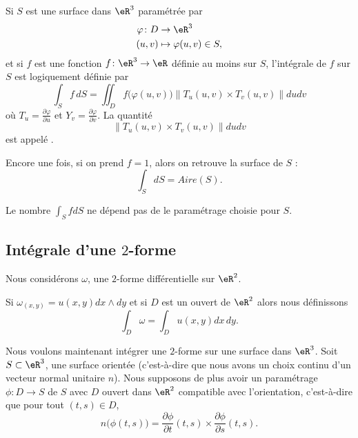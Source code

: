 Si \( S\) est une surface dans \( \eR^3\) paramétrée par
\begin{equation}
	\begin{aligned}
		\varphi\colon D & \to \eR^3                  \\
		(u,v)           & \mapsto \varphi(u,v)\in S,
	\end{aligned}
\end{equation}
et si \( f\) est une fonction \( f\colon \eR^3\to \eR\) définie au moins sur \( S\), l'intégrale de \( f\) sur \( S\) est logiquement définie par
\begin{equation}
	\int_S f\,dS=\iint_D f\big( \varphi(u,v) \big)\| T_u(u,v)\times T_v(u,v) \|dudv
\end{equation}
où \( T_u=\frac{ \partial \varphi }{ \partial u }\) et \( Y_v=\frac{ \partial \varphi }{ \partial v }\). La quantité
\begin{equation}
	\| T_u(u,v)\times T_v(u,v) \|dudv
\end{equation}
est appelé .

Encore une fois, si on prend \( f=1\), alors on retrouve la surface de \( S\) :
\begin{equation}
	\int_SdS=Aire(S).
\end{equation}

\begin{remark}
	Le nombre \( \int_SfdS\) ne dépend pas de le paramétrage choisie pour \( S\).
\end{remark}


\subsection{Intégrale d'une \( 2\)-forme}

Nous considérons \( \omega\), une \( 2\)-forme différentielle sur \( \eR^2\).
\begin{definition}
	Si \( \omega_{(x,y)}=u(x,y)dx\wedge dy\) et si \( D\) est un ouvert de \( \eR^2\) alors nous définissons
	\begin{equation}
		\int_D\omega=\int_D u(x,y)dx\,dy.
	\end{equation}
\end{definition}

Nous voulons maintenant intégrer une \( 2\)-forme sur une surface dans \( \eR^3\). Soit \( S\subset \eR^3\), une surface orientée (c'est-à-dire que nous avons un choix continu d'un vecteur normal unitaire \( n\)). Nous supposons de plus avoir un paramétrage \( \phi\colon D\to S\) de \( S\) avec \( D\) ouvert dans \( \eR^2\) compatible avec l'orientation, c'est-à-dire que pour tout \( (t,s)\in D\),
\begin{equation}
	n\big( \phi(t,s) \big)=\frac{ \partial \phi }{ \partial t }(t,s)\times \frac{ \partial \phi }{ \partial s }(t,s).
\end{equation}

